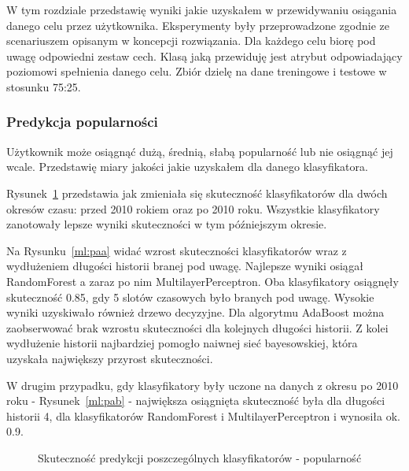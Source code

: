 \documentclass[polish,12pt]{aghthesis}
\begin{document}
W tym rozdziale przedstawię wyniki jakie uzyskałem w przewidywaniu osiągania danego celu przez użytkownika. Eksperymenty były przeprowadzone zgodnie ze scenariuszem opisanym w koncepcji rozwiązania. Dla każdego celu biorę pod uwagę odpowiedni zestaw cech. Klasą jaką przewiduję jest atrybut odpowiadający poziomowi spełnienia danego celu. Zbiór dzielę na dane treningowe i testowe w stosunku 75:25.

\subsubsection{Predykcja popularności}

Użytkownik może osiągnąć dużą, średnią, słabą popularność lub nie osiągnąć jej wcale. Przedstawię miary jakości jakie uzyskałem dla danego klasyfikatora.

Rysunek~\ref{ml:pa} przedstawia jak zmieniała się skuteczność klasyfikatorów dla dwóch okresów czasu: przed 2010 rokiem oraz po 2010 roku. Wszystkie klasyfikatory zanotowały lepsze wyniki skuteczności w tym późniejszym okresie. 

Na Rysunku~\ref{ml:paa} widać wzrost skuteczności klasyfikatorów wraz z wydłużeniem długości historii branej pod uwagę. Najlepsze wyniki osiągał RandomForest a zaraz po nim MultilayerPerceptron. Oba klasyfikatory osiągnęły skuteczność 0.85, gdy 5 slotów czasowych było branych pod uwagę. Wysokie wyniki uzyskiwało również drzewo decyzyjne. Dla algorytmu AdaBoost można zaobserwować brak wzrostu skuteczności dla kolejnych długości historii. Z kolei wydłużenie historii najbardziej pomogło naiwnej sieć bayesowskiej, która uzyskała największy przyrost skuteczności.

W drugim przypadku, gdy klasyfikatory były uczone na danych z okresu po 2010 roku - Rysunek~\ref{ml:pab} - największa osiągnięta skuteczność była dla długości historii 4, dla klasyfikatorów RandomForest i MultilayerPerceptron i wynosiła ok. 0.9.


\begin{figure}[htp] 
    \centering
    \hfill%
    \caption{Skuteczność predykcji poszczególnych klasyfikatorów - popularność}
    \label{ml:pa}
\end{figure}
\FloatBarrier
\end{document}
